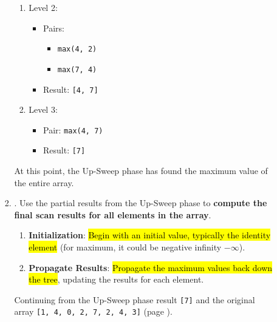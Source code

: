 \begin{itemize}
\begin{itemize}
\begin{enumerate}
\begin{examplebox}
\begin{enumerate}
                    \item Level 2:
                    \begin{itemize}
                        \item Pairs:
                        \begin{itemize}
                            \item \texttt{max(4, 2)}
                            \item \texttt{max(7, 4)}
                        \end{itemize}
                        \item Result: \texttt{[4, 7]}
                    \end{itemize}

                    \item Level 3:
                    \begin{itemize}
                        \item Pair: \texttt{max(4, 7)}
                        \item Result: \texttt{[7]}
                    \end{itemize}
                \end{enumerate}
                At this point, the Up-Sweep phase has found the maximum value of the entire array.
            \end{examplebox}

            \item {}. Use the partial results from the Up-Sweep phase to \textbf{compute the final scan results for all elements in the array}.
            \begin{enumerate}
                \item \textbf{Initialization}: \hl{Begin with an initial value, typically the identity element} (for maximum, it could be negative infinity $-\infty$).
                \item \textbf{Propagate Results}: \hl{Propagate the maximum values back down the tree}, updating the results for each element.
            \end{enumerate}
            \setcounter{example}{36}
            \begin{examplebox}
                Continuing from the Up-Sweep phase result \texttt{[7]} and the original array \texttt{[1, 4, 0, 2, 7, 2, 4, 3]} (page ).
                

\end{examplebox}
\end{enumerate}
\end{itemize}
\end{itemize}
